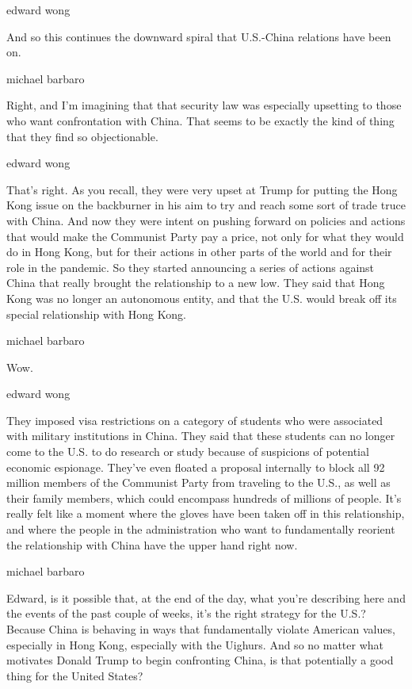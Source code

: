 edward wong

And so this continues the downward spiral that U.S.-China relations have
been on.

michael barbaro

Right, and I'm imagining that that security law was especially upsetting
to those who want confrontation with China. That seems to be exactly the
kind of thing that they find so objectionable.

edward wong

That's right. As you recall, they were very upset at Trump for putting
the Hong Kong issue on the backburner in his aim to try and reach some
sort of trade truce with China. And now they were intent on pushing
forward on policies and actions that would make the Communist Party pay
a price, not only for what they would do in Hong Kong, but for their
actions in other parts of the world and for their role in the pandemic.
So they started announcing a series of actions against China that really
brought the relationship to a new low. They said that Hong Kong was no
longer an autonomous entity, and that the U.S. would break off its
special relationship with Hong Kong.

michael barbaro

Wow.

edward wong

They imposed visa restrictions on a category of students who were
associated with military institutions in China. They said that these
students can no longer come to the U.S. to do research or study because
of suspicions of potential economic espionage. They've even floated a
proposal internally to block all 92 million members of the Communist
Party from traveling to the U.S., as well as their family members, which
could encompass hundreds of millions of people. It's really felt like a
moment where the gloves have been taken off in this relationship, and
where the people in the administration who want to fundamentally
reorient the relationship with China have the upper hand right now.

michael barbaro

Edward, is it possible that, at the end of the day, what you're
describing here and the events of the past couple of weeks, it's the
right strategy for the U.S.? Because China is behaving in ways that
fundamentally violate American values, especially in Hong Kong,
especially with the Uighurs. And so no matter what motivates Donald
Trump to begin confronting China, is that potentially a good thing for
the United States?

